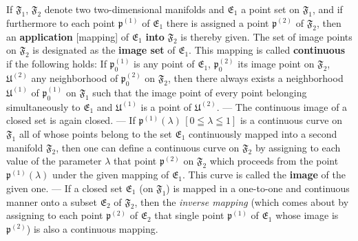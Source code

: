 \documentclass{article}
\begin{document}
If $\mathfrak{F}_1$, $\mathfrak{F}_2$ denote two two-dimensional manifolds and $\mathfrak{E}_1$ a point set on $\mathfrak{F}_1$, and if furthermore to each point $\mathfrak{p}^{(1)}$ of $\mathfrak{E}_1$ there is assigned a point $\mathfrak{p}^{(2)}$ of $\mathfrak{F}_2$, then an \textbf{application} [mapping] of $\mathfrak{E}_1$ \textbf{into} $\mathfrak{F}_2$ is thereby given. The set of image points on $\mathfrak{F}_2$ is designated as the \textbf{image set} of $\mathfrak{E}_1$. This mapping is called \textbf{continuous} if the following holds: If $\mathfrak{p}_0^{(1)}$ is any point of $\mathfrak{E}_1$, $\mathfrak{p}_0^{(2)}$ its image point on $\mathfrak{F}_2$, $\mathfrak{U}^{(2)}$ any neighborhood of $\mathfrak{p}_0^{(2)}$ on $\mathfrak{F}_2$, then there always exists a neighborhood $\mathfrak{U}^{(1)}$ of $\mathfrak{p}_0^{(1)}$ on $\mathfrak{F}_1$ such that the image point of every point belonging simultaneously to $\mathfrak{E}_1$ and $\mathfrak{U}^{(1)}$ is a point of $\mathfrak{U}^{(2)}$. --- The continuous image of a closed set is again closed. --- If $\mathfrak{p}^{(1)}(\lambda)\,[0 \leqq \lambda \leqq 1]$ is a continuous curve on $\mathfrak{F}_1$ all of whose points belong to the set $\mathfrak{E}_1$ continuously mapped into a second manifold $\mathfrak{F}_2$, then one can define a continuous curve on $\mathfrak{F}_2$ by assigning to each value of the parameter $\lambda$ that point $\mathfrak{p}^{(2)}$ on $\mathfrak{F}_2$ which proceeds from the point $\mathfrak{p}^{(1)}(\lambda)$ under the given mapping of $\mathfrak{E}_1$. This curve is called the \textbf{image} of the given one. --- If a closed set $\mathfrak{E}_1$ (on $\mathfrak{F}_1$) is mapped in a one-to-one and continuous manner onto a subset $\mathfrak{E}_2$ of $\mathfrak{F}_2$, then the \emph{inverse mapping} (which comes about by assigning to each point $\mathfrak{p}^{(2)}$ of $\mathfrak{E}_2$ that single point $\mathfrak{p}^{(1)}$ of $\mathfrak{E}_1$ whose image is $\mathfrak{p}^{(2)}$) is also a continuous mapping.
\end{document}
